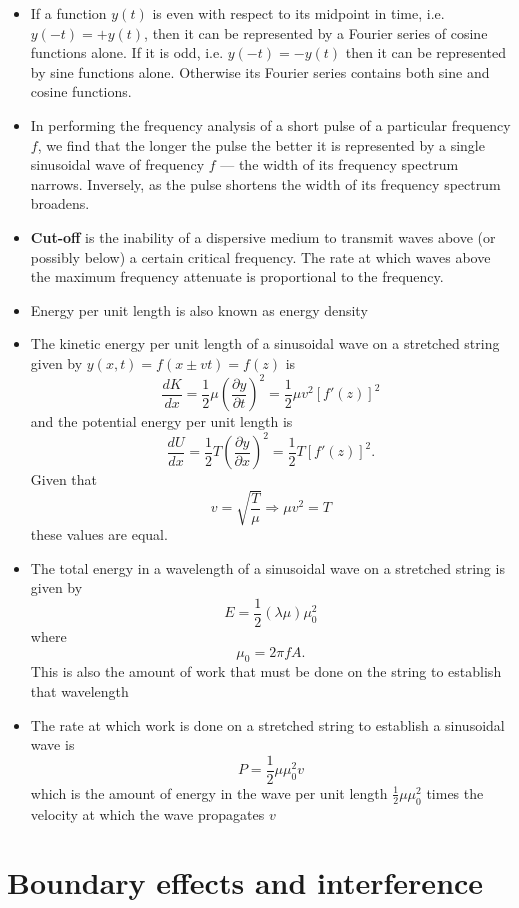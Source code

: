 \documentclass{article}
\begin{document}
\begin{itemize}
  \item If a function $y(t)$ is even with respect to its midpoint in time, i.e. $y(-t) = +y(t)$, then it can be represented by a Fourier series of cosine functions alone. If it is odd, i.e. $y(-t) = -y(t)$ then it can be represented by sine functions alone. Otherwise its Fourier series contains both sine and cosine functions.

  \item In performing the frequency analysis of a short pulse of a particular frequency $f$, we find that the longer the pulse the better it is represented by a single sinusoidal wave of frequency $f$ — the width of its frequency spectrum narrows. Inversely, as the pulse shortens the width of its frequency spectrum broadens.

  \item \textbf{Cut-off} is the inability of a dispersive medium to transmit waves above (or possibly below) a certain critical frequency. The rate at which waves above the maximum frequency attenuate is proportional to the frequency.

  \item Energy per unit length is also known as energy density

  \item The kinetic energy per unit length of a sinusoidal wave on a stretched string given by $y(x, t) = f(x \pm vt) = f(z)$ is \[\frac{d K}{d x} = \frac{1}{2} \mu \left( \frac{\partial y}{\partial t} \right)^2 = \frac{1}{2} \mu v^2 [f'(z)]^2\] and the potential energy per unit length is \[\frac{d U}{d x} = \frac{1}{2} T \left( \frac{\partial y}{\partial x} \right)^2 = \frac{1}{2} T [f'(z)]^2.\] Given that \[v = \sqrt{\frac{T}{\mu}} \Rightarrow \mu v^2 = T\] these values are equal.

  \item The total energy in a wavelength of a sinusoidal wave on a stretched string is given by \[E = \frac{1}{2} (\lambda \mu) \mu_0^2\] where \[\mu_0 = 2 \pi f A.\] This is also the amount of work that must be done on the string to establish that wavelength

  \item The rate at which work is done on a stretched string to establish a sinusoidal wave is \[P = \frac{1}{2} \mu \mu_0^2 v\] which is the amount of energy in the wave per unit length $\frac{1}{2} \mu \mu_0^2$ times the velocity at which the wave propagates $v$
\end{itemize}

\section{Boundary effects and interference}
\end{document}
